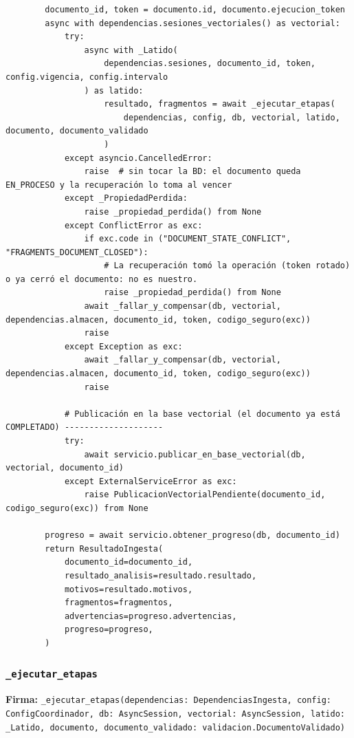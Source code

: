\documentclass[11pt,a4paper]{article}
\begin{document}
\begin{lstlisting}
        documento_id, token = documento.id, documento.ejecucion_token
        async with dependencias.sesiones_vectoriales() as vectorial:
            try:
                async with _Latido(
                    dependencias.sesiones, documento_id, token, config.vigencia, config.intervalo
                ) as latido:
                    resultado, fragmentos = await _ejecutar_etapas(
                        dependencias, config, db, vectorial, latido, documento, documento_validado
                    )
            except asyncio.CancelledError:
                raise  # sin tocar la BD: el documento queda EN_PROCESO y la recuperación lo toma al vencer
            except _PropiedadPerdida:
                raise _propiedad_perdida() from None
            except ConflictError as exc:
                if exc.code in ("DOCUMENT_STATE_CONFLICT", "FRAGMENTS_DOCUMENT_CLOSED"):
                    # La recuperación tomó la operación (token rotado) o ya cerró el documento: no es nuestro.
                    raise _propiedad_perdida() from None
                await _fallar_y_compensar(db, vectorial, dependencias.almacen, documento_id, token, codigo_seguro(exc))
                raise
            except Exception as exc:
                await _fallar_y_compensar(db, vectorial, dependencias.almacen, documento_id, token, codigo_seguro(exc))
                raise

            # Publicación en la base vectorial (el documento ya está COMPLETADO) --------------------
            try:
                await servicio.publicar_en_base_vectorial(db, vectorial, documento_id)
            except ExternalServiceError as exc:
                raise PublicacionVectorialPendiente(documento_id, codigo_seguro(exc)) from None

        progreso = await servicio.obtener_progreso(db, documento_id)
        return ResultadoIngesta(
            documento_id=documento_id,
            resultado_analisis=resultado.resultado,
            motivos=resultado.motivos,
            fragmentos=fragmentos,
            advertencias=progreso.advertencias,
            progreso=progreso,
        )
\end{lstlisting}

\subsubsection*{\texttt{\_ejecutar\_etapas}}
\textbf{Firma:} \texttt{\_ejecutar\_etapas(dependencias: DependenciasIngesta, config: ConfigCoordinador, db: AsyncSession, vectorial: AsyncSession, latido: \_Latido, documento, documento\_validado: validacion.DocumentoValidado)}
\end{document}
